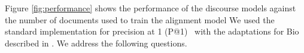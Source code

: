 %
%

Figure \ref{fig:performance} shows the performance of the discourse models against the number of documents used to train the alignment model
We used the standard implementation for precision at 1 (P@1)~\citep{manning08} with the adaptations for Bio described in \citet{jansen14}. We address the following questions.

